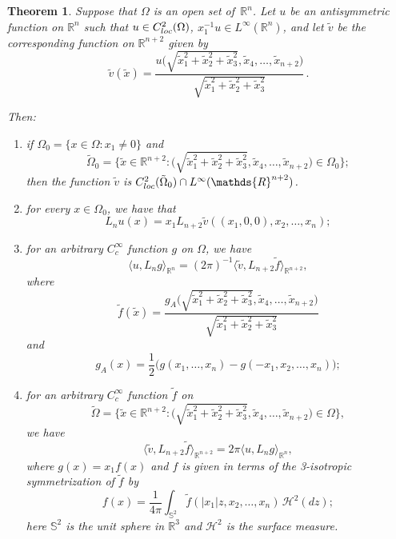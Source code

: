 \documentclass[a4paper,12pt,reqno]{amsart}
\numberwithin{equation}{section}
\newtheorem{theorem}{Theorem}[section]
\theoremstyle{definition}
\theoremstyle{notation}
\newcommand{\R}{\mathds{R}}
\newcommand{\sph}{\mathds{S}}
\begin{document}
\begin{theorem}
\label{thm:odd:flapBIS}
Suppose that $\Omega$ is an open set of~$\R^n$. Let $u$ be an antisymmetric function on $\R^n$ such that $u\in C^2_{{\rm{loc}}}(\Omega)$, $x_1^{-1}u \in L^\infty(\R^n)$,  and let $\tilde{v}$ be the corresponding function on $\R^{n + 2}$ given by
\begin{equation}\label{IPBN}
 \tilde{v}(\tilde{x}) = \frac{u\big (\sqrt{\tilde x_1^2 + \tilde x_2^2 + \tilde x_3^2}, \tilde x_4, \ldots, \tilde x_{n+2} \big )}{\sqrt{\tilde{x}_1^2 + \tilde{x}_2^2 + \tilde{x}_3^2}} \, .
\end{equation}


Then:
\begin{enumerate}[label={\rm (\alph*)}]
\item\label{thm:odd:flap:aBIS} if $\Omega_0 = \{x \in \Omega : x_1 \ne 0\}$ and 
\[
 \tilde \Omega_0 = \bigg \{\tilde{x} \in \R^{n + 2} : \Big (\sqrt{\tilde x_1^2 + \tilde x_2^2 + \tilde x_3^2}, \tilde x_4, \ldots, \tilde x_{n+2} \Big ) \in \Omega_0\bigg \} ;
\]
then the function $\tilde{v}$ is $C^2_{{\rm{loc}}} (\tilde \Omega_0) \cap L^\infty(\R^{n+2}) $. 


\item\label{thm:odd:flap:cBIS} for every $x \in \Omega_0$, we have that
\begin{equation}
\label{eq:odd:flapBIS}
L_nu(x) = x_1 L_{n+2} \tilde{v}((x_1, 0, 0), x_2, \ldots, x_n);
\end{equation}
\item\label{thm:odd:flap:dBIS} for an arbitrary $C_c^\infty$ function $g$ on $\Omega$, we have
\begin{equation}
\label{eq:odd:flap:weakBIS}
 \langle u, L_n g \rangle_{\R^n} = (2 \pi)^{-1} \langle \tilde{v}, L_{n+2} \tilde{f} \rangle_{\R^{n + 2}} ,
\end{equation}
where
\[ \tilde{f}(\tilde{x}) = \frac{g_A\big (\sqrt{\tilde x_1^2 + \tilde x_2^2 + \tilde x_3^2}, \tilde x_4, \ldots, \tilde x_{n+2} \big ) }{\sqrt{\tilde x_1^2 + \tilde x_2^2 + \tilde x_3^2}} \]
and
\[ g_A(x) = \frac 12 \big (  g(x_1,\dots,x_n) - g(-x_1,x_2,\dots,x_n) \big ) ; \]
\item\label{thm:odd:flap:eBIS} for an arbitrary $C_c^\infty$ function $\tilde{f}$ on
\[ \tilde \Omega=\bigg \{\tilde{x} \in \R^{n + 2} : \Big (\sqrt{\tilde x_1^2 + \tilde x_2^2 + \tilde x_3^2}, \tilde x_4, \ldots, \tilde x_{n+2} \Big ) \in \Omega \bigg \}, \]%
we have
\begin{equation}
\label{eq:odd:flap:reverseBIS}
\langle \tilde{v}, L_{n+2}\tilde{f} \rangle_{\R^{n + 2}} = 2 \pi \langle u, L_n g \rangle_{\R^n} ,
\end{equation}
where $g(x) = x_1 f(x)$ and $f$ is given in terms of the 3-isotropic symmetrization of $\tilde{f}$ by
\begin{equation*}
 f(x) = \frac{1}{4 \pi} \int_{\sph^2} \tilde{f}(|x_1| z, x_2, \ldots, x_n)\, \mathcal H^2(dz) ;
\end{equation*}
here $\sph^2$ is the unit sphere in $\R^3$ and $\mathcal H^2$ is the surface measure.
\end{enumerate}
\end{theorem}
\end{document}

